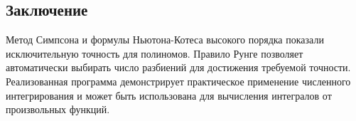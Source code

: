 \documentclass[a4paper,12pt]{article}
\begin{document}
\subsection{Заключение}

Метод Симпсона и формулы Ньютона-Котеса высокого порядка показали исключительную точность для полиномов. Правило Рунге позволяет автоматически выбирать число разбиений для достижения требуемой точности. Реализованная программа демонстрирует практическое применение численного интегрирования и может быть использована для вычисления интегралов от произвольных функций.
\end{document}
